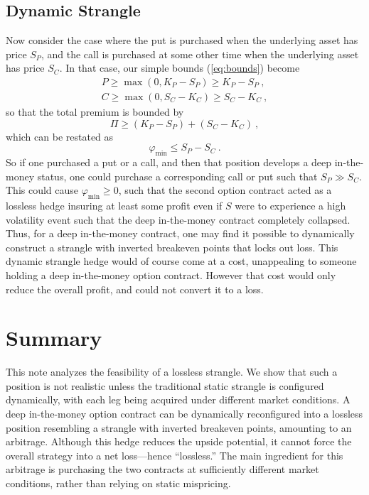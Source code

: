 \documentclass[aps,reprint]{revtex4-2}
\begin{document}
\subsection{Dynamic Strangle}
Now consider the case where the put is purchased when the underlying asset has price $S_P$, and the call is purchased at some other time when the underlying asset has price $S_C$.  In that case, our simple bounds (\ref{eq:bounds}) become
\begin{subequations} \label{eq:dynamicbounds}
\begin{align}
P \geq \max(0, K_P - S_P) \geq K_P - S_P~,\\
C \geq \max(0, S_C - K_C) \geq S_C - K_C~,
\end{align}
\end{subequations}
so that the total premium is bounded by
\begin{equation}
\Pi \geq (K_P - S_P) + (S_C - K_C)~,
\end{equation}
which can be restated as
\begin{equation}
\varphi_{\min} \leq S_P - S_C~.
\end{equation}
So if one purchased a put or a call, and then that position develops a deep in-the-money status, one could purchase a corresponding call or put such that $S_P \gg S_C$.  This could cause $\varphi_{\min} \geq 0$, such that the second option contract acted as a lossless hedge insuring at least some profit even if $S$ were to experience a high volatility event such that the deep in-the-money contract completely collapsed.
Thus, for a deep in-the-money contract, one may find it possible to dynamically construct a strangle with inverted breakeven points that locks out loss.  This dynamic strangle hedge would of course come at a cost, unappealing to someone holding a deep in-the-money option contract. However that cost would only reduce the overall profit, and could not convert it to a loss.

\section{Summary}

This note analyzes the feasibility of a lossless strangle. We show that such a position is not realistic unless the traditional static strangle is configured dynamically, with each leg being acquired under different market conditions.  A deep in-the-money option contract can be dynamically reconfigured into a lossless position resembling a strangle with inverted breakeven points, amounting to an arbitrage.  Although this hedge reduces the upside potential, it cannot force the overall strategy into a net loss—hence “lossless.”  The main ingredient for this arbitrage is purchasing the two contracts at sufficiently different market conditions, rather than relying on static mispricing.
\end{document}
